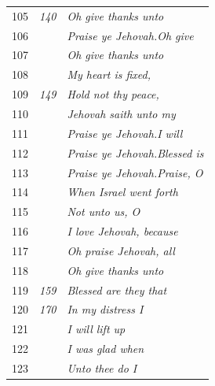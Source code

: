 \documentclass{article}
\newlength{\minipageheight}
\newlength{\minipagewidth}
\begin{document}
\begin{minipage}[r][\minipageheight][t]{\minipagewidth}
\begin{longtable}{ccl}
        105         & \textit{140} & \textit{Oh give thanks unto}          \\
        106         &              & \textit{Praise ye Jehovah.Oh give}    \\
        107         &              & \textit{Oh give thanks unto}          \\
        108         &              & \textit{My heart is fixed,}           \\
        109         & \textit{149} & \textit{Hold not thy peace,}          \\
        110         &              & \textit{Jehovah saith unto my}        \\
        111         &              & \textit{Praise ye Jehovah.I will}     \\
        112         &              & \textit{Praise ye Jehovah.Blessed is} \\
        113         &              & \textit{Praise ye Jehovah.Praise, O}  \\
        114         &              & \textit{When Israel went forth}       \\
        115         &              & \textit{Not unto us, O}               \\
        116         &              & \textit{I love Jehovah, because}      \\
        117         &              & \textit{Oh praise Jehovah, all}       \\
        118         &              & \textit{Oh give thanks unto}          \\
        119         & \textit{159} & \textit{Blessed are they that}        \\
        120         & \textit{170} & \textit{In my distress I}             \\
        121         &              & \textit{I will lift up}               \\
        122         &              & \textit{I was glad when}              \\
        123         &              & \textit{Unto thee do I}               \\
    \end{longtable}
\end{minipage}%
%
%
\end{document}
